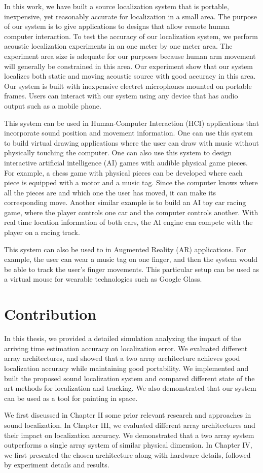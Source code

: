 In this work, we have built a source localization system that is portable, inexpensive, yet reasonably accurate for localization in a small area. The purpose of our system is to give applications to designs that allow remote human computer interaction. To test the accuracy of our localization system, we perform acoustic localization experiments in an one meter by one meter area. The experiment area size is adequate for our purposes because human arm movement will generally be constrained in this area. Our experiment show that our system localizes both static and moving acoustic source with good accuracy in this area. Our system is built with inexpensive electret microphones mounted on portable frames. Users can interact with our system using any device that has audio output such as a mobile phone.

This system can be used in Human-Computer Interaction (HCI) applications that incorporate sound position and movement information. One can use this system to build virtual drawing applications where the user can draw with music without physically touching the computer. One can also use this system to design interactive artificial intelligence (AI) games with audible physical game pieces. For example, a chess game with physical pieces can be developed where each piece is equipped with a motor and a music tag. Since the computer knows where all the pieces are and which one the user has moved, it can make its corresponding move. Another similar example is to build an AI toy car racing game, where the player controls one car and the computer controls another. With real time location information of both cars, the AI engine can compete with the player on a racing track. 

This system can also be used to in Augmented Reality (AR) applications. For example, the user can wear a music tag on one finger, and then the system would be able to track the user's finger movements. This particular setup can be used as a virtual mouse for wearable technologies such as Google Glass. 


\section{Contribution}
In this thesis, we provided a detailed simulation analyzing the impact of the arriving time estimation accuracy on localization error. We evaluated different array architectures, and showed that a two array architecture achieves good localization accuracy while maintaining good portability. We implemented and built the proposed sound localization system and compared different state of the art methods for localization and tracking. We also demonstrated that our system can be used as a tool for painting in space.

We first discussed in Chapter II some prior relevant research and approaches in sound localization. In Chapter III, we evaluated different array architectures and their impact on localization accuracy. We demonstrated that a two array system outperforms a single array system of similar physical dimension. In Chapter IV, we first presented the chosen architecture along with hardware details, followed by experiment details and results. 


